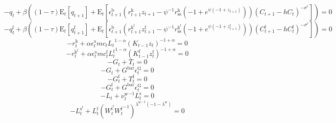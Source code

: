 \begin{equation}
-q_{t} + {\beta} \left(\left(1 - \tau\right) {\mathrm{E}_{t}\left[q_{t+1}\right]} + \mathrm{E}_{t}\left[{\epsilon^{\mathrm{b}}_{t+1}} \left({r^{\mathrm{k}}_{t+1}} {z_{t+1}} - {\psi}^{-1} {r^{\mathrm{k}}_\mathrm{ss}} \left(-1 + e^{{\psi} \left(-1 + z_{t+1}\right)}\right)\right) {\left(C_{t+1} - {h} {C_{t}}\right)^{-\sigma^{\mathrm{c}}}}\right]\right) = 0
\end{equation}
\begin{equation}
-q^{\mathrm{f}}_{t} + {\beta} \left(\left(1 - \tau\right) {\mathrm{E}_{t}\left[q^{\mathrm{f}}_{t+1}\right]} + \mathrm{E}_{t}\left[{\epsilon^{\mathrm{b}}_{t+1}} \left({r^{\mathrm{k}^{\mathrm{f}}}_{t+1}} {z^{\mathrm{f}}_{t+1}} - {\psi}^{-1} {r^{\mathrm{k}^{\mathrm{f}}}_\mathrm{ss}} \left(-1 + e^{{\psi} \left(-1 + z^{\mathrm{f}}_{t+1}\right)}\right)\right) {\left(C^{\mathrm{f}}_{t+1} - {h} {C^{\mathrm{f}}_{t}}\right)^{-\sigma^{\mathrm{c}}}}\right]\right) = 0
\end{equation}
\begin{equation}
-r^{\mathrm{k}}_{t} + {\alpha} {\epsilon^{\mathrm{a}}_{t}} {{m\!c}_{t}} {{L_{t}}^{1 - \alpha}} {\left({K_{t-1}} {z_{t}}\right)^{-1 + \alpha}} = 0
\end{equation}
\begin{equation}
-r^{\mathrm{k}^{\mathrm{f}}}_{t} + {\alpha} {\epsilon^{\mathrm{a}}_{t}} {{m\!c}^{\mathrm{f}}_{t}} {{L^{\mathrm{f}}_{t}}^{1 - \alpha}} {\left({K^{\mathrm{f}}_{t-1}} {z^{\mathrm{f}}_{t}}\right)^{-1 + \alpha}} = 0
\end{equation}
\begin{equation}
-G_{t} + T_{t} = 0
\end{equation}
\begin{equation}
-G_{t} + {G^{\mathrm{bar}}} {\epsilon^{\mathrm{G}}_{t}} = 0
\end{equation}
\begin{equation}
-G^{\mathrm{f}}_{t} + T^{\mathrm{f}}_{t} = 0
\end{equation}
\begin{equation}
-G^{\mathrm{f}}_{t} + {G^{\mathrm{bar}}} {\epsilon^{\mathrm{G}}_{t}} = 0
\end{equation}
\begin{equation}
-L_{t} + {\nu^{\mathrm{w}}_{t}}^{-1} {L^{\mathrm{s}}_{t}} = 0
\end{equation}
\begin{equation}
-L^{\mathrm{s}^{\mathrm{f}}}_{t} + {L^{\mathrm{f}}_{t}} {\left({W^{\mathrm{i}^{\mathrm{f}}}_{t}} {W^{\mathrm{f}}_{t}}^{-1}\right)^{{\lambda^{\mathrm{w}}}^{-1} \left(-1 - \lambda^{\mathrm{w}}\right)}} = 0
\end{equation}
